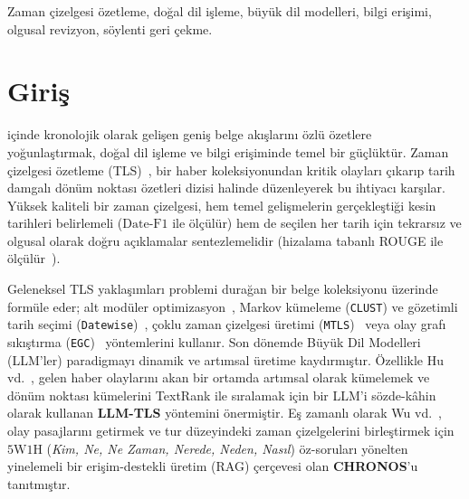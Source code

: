 ﻿\documentclass[journal]{IEEEtran}
\begin{document}
\begin{IEEEkeywords}
Zaman \c{c}izelgesi \"{o}zetleme, do\u{g}al dil i\c{s}leme, b\"{u}y\"{u}k dil modelleri, bilgi eri\c{s}imi, olgusal revizyon, s\"{o}ylenti geri \c{c}ekme.
\end{IEEEkeywords}

\section{Giri\c{s}}
\label{sec:intro}

 i\c{c}inde kronolojik olarak geli\c{s}en geni\c{s} belge ak{\i}\c{s}lar{\i}n{\i} \"{o}zl\"{u} \"{o}zetlere yo\u{g}unla\c{s}t{\i}rmak, do\u{g}al dil i\c{s}leme ve bilgi eri\c{s}iminde temel bir g\"{u}\c{c}l\"{u}kt\"{u}r. Zaman \c{c}izelgesi \"{o}zetleme (TLS)~\cite{tran2013leveraging, martschat2018temporally, ghalandari2020examining}, bir haber koleksiyonundan kritik olaylar{\i} \c{c}{\i}kar{\i}p tarih damgal{\i} d\"{o}n\"{u}m noktas{\i} \"{o}zetleri dizisi halinde d\"{u}zenleyerek bu ihtiyac{\i} kar\c{s}{\i}lar. Y\"{u}ksek kaliteli bir zaman \c{c}izelgesi, hem temel geli\c{s}melerin ger\c{c}ekle\c{s}ti\u{g}i kesin tarihleri belirlemeli ($\text{Date-F1}$ ile \"{o}l\c{c}\"{u}l\"{u}r) hem de se\c{c}ilen her tarih i\c{c}in tekrars{\i}z ve olgusal olarak do\u{g}ru a\c{c}{\i}klamalar sentezlemelidir (hizalama tabanl{\i} ROUGE ile \"{o}l\c{c}\"{u}l\"{u}r~\cite{martschat2017improving}).

Geleneksel TLS yakla\c{s}{\i}mlar{\i} problemi dura\u{g}an bir belge koleksiyonu \"{u}zerinde form\"{u}le eder; alt mod\"{u}ler optimizasyon~\cite{martschat2018temporally}, Markov k\"{u}meleme (\texttt{CLUST}) ve g\"{o}zetimli tarih se\c{c}imi (\texttt{Datewise})~\cite{ghalandari2020examining}, \c{c}oklu zaman \c{c}izelgesi \"{u}retimi (\texttt{MTLS})~\cite{yu2021multi} veya olay graf{\i} s{\i}k{\i}\c{s}t{\i}rma (\texttt{EGC})~\cite{li2021timeline} y\"{o}ntemlerini kullan{\i}r. Son d\"{o}nemde B\"{u}y\"{u}k Dil Modelleri (LLM'ler) paradigmay{\i} dinamik ve art{\i}msal \"{u}retime kayd{\i}rm{\i}\c{s}t{\i}r. \"{O}zellikle Hu vd.~\cite{hu2024moments}, gelen haber olaylar{\i}n{\i} akan bir ortamda art{\i}msal olarak k\"{u}melemek ve d\"{o}n\"{u}m noktas{\i} k\"{u}melerini TextRank ile s{\i}ralamak i\c{c}in bir LLM'i s\"{o}zde-k\^{a}hin olarak kullanan \textbf{LLM-TLS} y\"{o}ntemini \"{o}nermi\c{s}tir. E\c{s} zamanl{\i} olarak Wu vd.~\cite{wu2025unfolding}, olay pasajlar{\i}n{\i} getirmek ve tur d\"{u}zeyindeki zaman \c{c}izelgelerini birle\c{s}tirmek i\c{c}in $5\text{W}1\text{H}$ (\textit{Kim, Ne, Ne Zaman, Nerede, Neden, Nas{\i}l}) \"{o}z-sorular{\i} y\"{o}nelten yinelemeli bir eri\c{s}im-destekli \"{u}retim (RAG) \c{c}erçevesi olan \textbf{CHRONOS}'u tan{\i}tm{\i}\c{s}t{\i}r.
\end{document}
